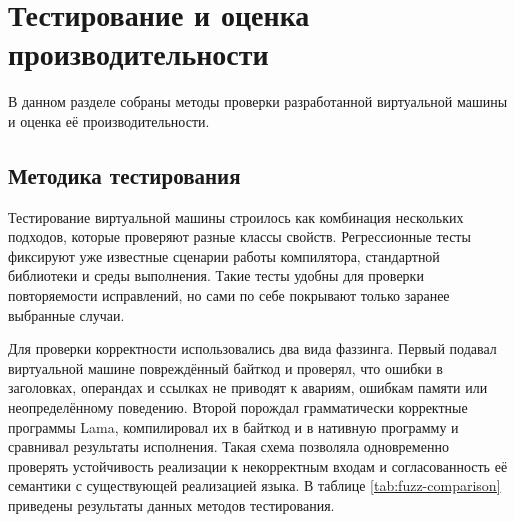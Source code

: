 
\section{Тестирование и оценка производительности}
\label{sec:testing-performance}

В данном разделе собраны методы проверки разработанной виртуальной машины и
оценка её производительности. 
\subsection{Методика тестирования}
\label{subsec:testing-methodology}


Тестирование виртуальной машины строилось как комбинация нескольких подходов,
которые проверяют разные классы свойств. Регрессионные тесты фиксируют уже
известные сценарии работы компилятора, стандартной библиотеки и среды
выполнения. Такие
тесты удобны для проверки повторяемости исправлений, но сами по себе покрывают
только заранее выбранные случаи.

Для проверки корректности использовались два вида фаззинга. Первый подавал виртуальной машине
повреждённый байткод и проверял, что ошибки в заголовках, операндах и ссылках не приводят к авариям,
ошибкам памяти или неопределённому поведению. Второй порождал грамматически корректные программы Lama,
компилировал их в байткод и в нативную программу и сравнивал результаты исполнения. Такая схема
позволяла одновременно проверять устойчивость реализации к некорректным входам и согласованность её
семантики с существующей реализацией языка. В таблице \ref{tab:fuzz-comparison} приведены результаты данных
методов тестирования.
\begin{table}[H]
    \def\arraystretch{1.1}
    \centering
    \caption{Сравнение результатов байткодного и грамматического фаззинга}
    \label{tab:fuzz-comparison}
\end{table}
 

